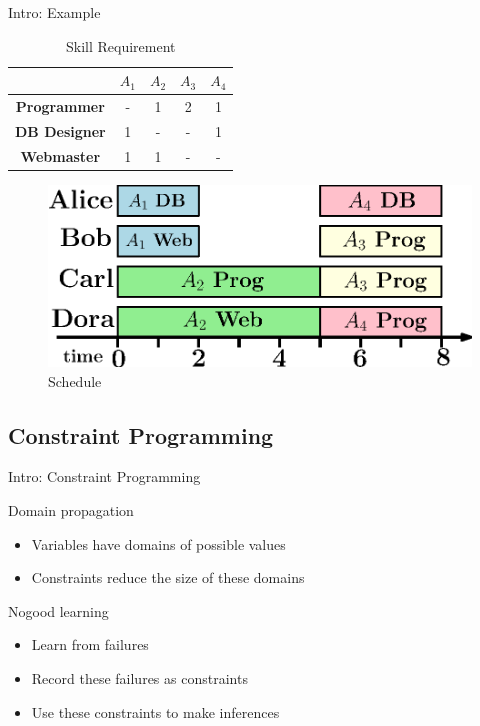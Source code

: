 \documentclass{beamer}
\begin{document}
\begin{frame}{Intro: Example}
\begin{multicols}{2}
		\begin{table}
			\caption{Skill Requirement}
			\begin{tabular}{c|cccc}
				\hline
				 & $A_1$ & $A_2$ & $A_3$ & $A_4$ \\
				\hline
				{\tiny {\bf Programmer}} & - & 1 & 2 & 1 \\
				{\tiny {\bf DB Designer}} & 1 & - & - & 1 \\
				{\tiny {\bf Webmaster}} & 1 & 1 & - & - \\
				\hline
			\end{tabular}
		\end{table}\pause
		\vspace{-8mm}
		\begin{figure}[H]
			\includegraphics[width=\linewidth]{images/sched.eps}
			\caption{Schedule}
		\end{figure}

	\end{multicols}
\end{frame}

\subsection{Constraint Programming}
\begin{frame}{Intro: Constraint Programming}
	\begin{multicols}{2}
		Domain propagation
		\begin{itemize}
			\item Variables have domains of possible values
			\item Constraints reduce the size of these domains
		\end{itemize}\pause
		\columnbreak
		Nogood learning
		\begin{itemize}
			\item Learn from failures
			\item Record these failures as constraints
			\item Use these constraints to make inferences
		\end{itemize}
	\end{multicols}
\end{frame}
\end{document}
